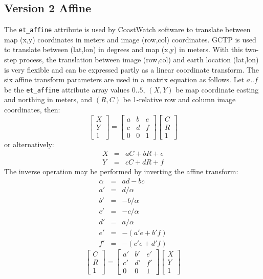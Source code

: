 \subsection{Version 2 Affine}

The {\tt et\_affine} attribute is used by CoastWatch software to
translate between map (x,y) coordinates in meters and image (row,col)
coordinates. GCTP is used to translate between (lat,lon) in degrees
and map (x,y) in meters. With this two-step process, the translation
between image (row,col) and earth location (lat,lon) is very flexible
and can be expressed partly as a linear coordinate transform. The six
affine transform parameters are used in a matrix equation as follows.
Let $a..f$ be the {\tt et\_affine} attribute array values $0..5$,
$(X,Y)$ be map coordinate easting and northing in meters, and $(R,C)$
be 1-relative row and column image coordinates, then:
\[
  \left[ \begin{array}{c}
           X \\
           Y \\
           1
         \end{array}  
  \right]
  = 
  \left[ \begin{array}{ccc}
           a & b & e \\
           c & d & f \\
           0 & 0 & 1
         \end{array}
  \right]
  \left[ \begin{array}{c}
           C \\
           R \\
           1
         \end{array}
  \right]
\]
or alternatively:
\begin{eqnarray*}
  X & = & a C + b R + e \\
  Y & = & c C + d R + f
\end{eqnarray*}
The inverse operation may be performed by inverting the affine transform: 
\begin{eqnarray*}
  \alpha & = & ad - bc \\
   a' & = &  d / \alpha \\
   b' & = & -b / \alpha \\
   c' & = & -c / \alpha \\
   d' & = &  a / \alpha \\
   e' & = & -(a'e + b'f) \\
   f' & = & -(c'e + d'f)
\end{eqnarray*}
\[
  \left[ \begin{array}{c}
           C \\
           R \\
           1
         \end{array}  
  \right]
  = 
  \left[ \begin{array}{ccc}
           a' & b' & e' \\
           c' & d' & f' \\
           0 & 0 & 1
         \end{array}
  \right]
  \left[ \begin{array}{c}
           X \\
           Y \\
           1
         \end{array}
  \right]
\]
